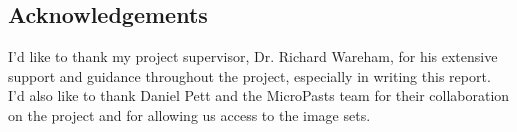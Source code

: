 \documentclass[12pt]{IIBproject}
\begin{document}
\subsection{Acknowledgements}
I'd like to thank my project supervisor, Dr. Richard Wareham, for his extensive support and guidance throughout the project, especially in writing this report. I'd also like to thank Daniel Pett and the MicroPasts team for their collaboration on the project and for allowing us access to the image sets.
\newpage

\end{document}
